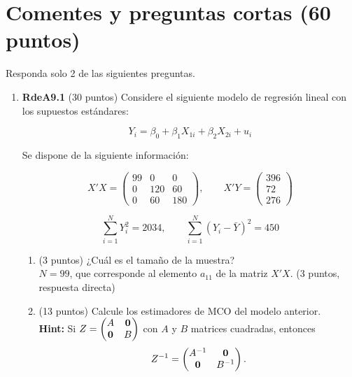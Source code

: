 \documentclass[10pt,a4paper]{article}
\begin{document}
\section{Comentes y preguntas cortas (60 puntos)}

Responda solo 2 de las siguientes preguntas.

\begin{enumerate}
    \item \textbf{RdeA9.1} (30 puntos) 
Considere el siguiente modelo de regresión lineal con los supuestos estándares:

\[
Y_i = \beta_0 + \beta_1 X_{1i} + \beta_2 X_{2i} + u_i
\]

Se dispone de la siguiente información:

\[
X'X = 
\begin{pmatrix}
99 & 0 & 0 \\
0 & 120 & 60 \\
0 & 60 & 180
\end{pmatrix},
\qquad
X'Y = 
\begin{pmatrix}
396 \\
72 \\
276
\end{pmatrix}
\]

\[
\sum_{i=1}^{N} Y_i^2 = 2034, 
\qquad 
\sum_{i=1}^{N} (Y_i - \bar{Y})^2 = 450
\]

\begin{enumerate}
    \item (3 puntos) ¿Cuál es el tamaño de la muestra?\\

    {\color{blue}
    $N = 99$, que corresponde al elemento $a_{11}$ de la matriz $X'X$.
    } (3 puntos, respuesta directa)\\[0.25em]
    
    \item (13 puntos) Calcule los estimadores de MCO del modelo anterior.\\
    \textbf{Hint:} Si \( Z = \begin{pmatrix} A &{\bf 0} \\ {\bf 0} & B \end{pmatrix} \) con \( A \) y \( B \) matrices cuadradas, entonces
    \[
    Z^{-1} = \begin{pmatrix} A^{-1} & {\bf 0} \\ {\bf 0} & B^{-1} \end{pmatrix}.
    \]


\end{enumerate}
\end{enumerate}
\end{document}
